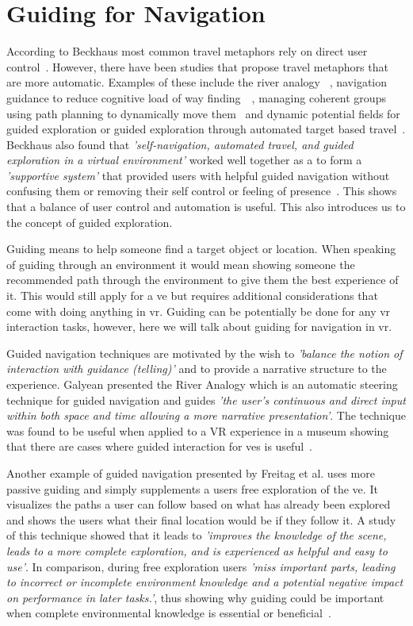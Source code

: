 \section{Guiding for Navigation}
\label{section RW: Guiding for Navigation}
According to Beckhaus most common travel metaphors rely on direct user control~\cite[p. 6]{Beckhaus2002}. However, there have been studies that propose travel metaphors that are more automatic. Examples of these include the river analogy ~\cite{Galyean1995}, navigation guidance to reduce cognitive load of way finding~\cite{Elmqvist2005}~\cite{Elmqvist2008}, managing coherent groups using path planning to dynamically move them~\cite{Silveira2008} and dynamic potential fields for guided exploration or guided exploration through automated target based travel~\cite{Beckhaus2002}. Beckhaus also found that \textit{'self-navigation, automated travel, and guided exploration in a virtual environment'} worked well together as a to form a \textit{'supportive system'} that provided users with helpful guided navigation without confusing them or removing their self control or feeling of presence~\cite[p. 8]{Beckhaus2002}. This shows that a balance of user control and automation is useful. This also introduces us to the concept of guided exploration.

Guiding means to help someone find a target object or location. When speaking of guiding through an environment it would mean showing someone the recommended path through the environment to give them the best experience of it. This would still apply for a \acrshort{ve} but requires additional considerations that come with doing anything in \acrfull{vr}. Guiding can be potentially be done for any \acrshort{vr} interaction tasks, however, here we will talk about guiding for navigation in \acrshort{vr}.

Guided navigation techniques are motivated by the wish to \textit{'balance the notion of interaction with guidance (telling)'} and to provide a narrative structure to the experience. Galyean presented the River Analogy which is an automatic steering technique for guided navigation and guides \textit{'the user’s continuous and direct input within both space and time allowing a more narrative presentation'}. The technique was found to be useful when applied to a VR experience in a museum showing that there are cases where guided interaction for \acrshort{ve}s is useful~\cite{Galyean1995}.

Another example of guided navigation presented by Freitag et al. uses more passive guiding and simply supplements a users free exploration of the \acrshort{ve}. It visualizes the paths a user can follow based on what has already been explored and shows the users what their final location would be if they follow it. A study of this technique showed that it leads to \textit{'improves the knowledge of the scene, leads to a more complete exploration, and is experienced as helpful and easy to use'}. In comparison, during free exploration users \textit{'miss important parts, leading to incorrect or incomplete environment knowledge and a potential negative impact on performance in later tasks.'}, thus showing why guiding could be important when complete environmental knowledge is essential or beneficial~\cite{Freitag2018}.


